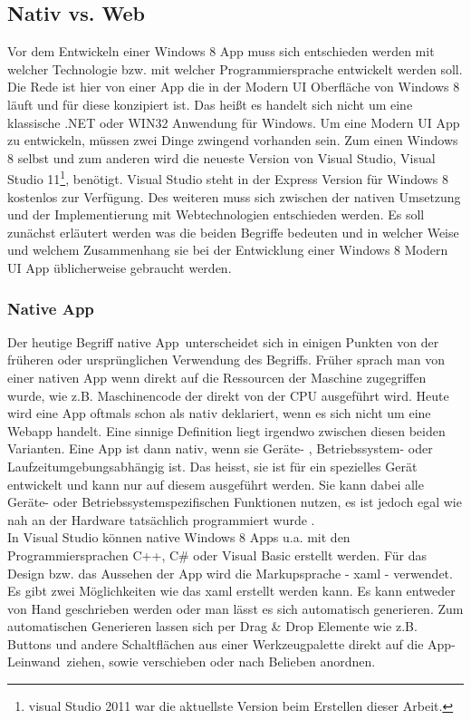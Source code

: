 \documentclass[12pt,a4paper]{scrartcl}
\begin{document}
\subsection{Nativ vs. Web}
\label{nativ_vs_web}
Vor dem Entwickeln einer Windows 8 App muss sich entschieden werden mit welcher Technologie bzw. mit welcher Programmiersprache entwickelt werden soll. Die Rede ist hier von einer App die in der Modern UI Oberfläche von Windows 8 läuft und für diese konzipiert ist. Das heißt es handelt sich nicht um eine klassische .NET oder WIN32 Anwendung für Windows. Um eine Modern UI App zu entwickeln, müssen zwei Dinge zwingend vorhanden sein. Zum einen Windows 8 selbst und zum anderen wird die neueste Version von Visual Studio, Visual Studio 11\footnote{visual Studio 2011 war die aktuellste Version beim Erstellen dieser Arbeit.}, benötigt. Visual Studio steht in der Express Version für Windows 8 kostenlos zur Verfügung. Des weiteren muss sich zwischen der nativen Umsetzung und der Implementierung mit Webtechnologien entschieden werden. Es soll zunächst erläutert werden was die beiden Begriffe bedeuten und in welcher Weise und welchem Zusammenhang sie bei der Entwicklung einer Windows 8 Modern UI App üblicherweise gebraucht werden.

\subsubsection{Native App}
\label{subsubsec:nativ}
Der heutige Begriff \glqq native App\grqq\ unterscheidet sich in einigen Punkten von der früheren oder ursprünglichen Verwendung des Begriffs. Früher sprach man von einer nativen App wenn direkt auf die Ressourcen der  Maschine zugegriffen wurde, wie z.B. Maschinencode der direkt von der CPU ausgeführt wird. Heute wird eine App oftmals schon als nativ deklariert, wenn es sich nicht um eine Webapp handelt. Eine sinnige Definition liegt irgendwo zwischen diesen beiden Varianten. Eine App ist dann nativ, wenn sie Geräte- , Betriebssystem- oder Laufzeitumgebungsabhängig ist. Das heisst, sie ist für ein spezielles Gerät entwickelt und kann nur auf diesem ausgeführt werden. Sie kann dabei alle Geräte- oder Betriebssystemspezifischen Funktionen nutzen, es ist jedoch egal wie nah an der Hardware tatsächlich programmiert wurde \citep{OBrian2013}.\\
In Visual Studio können native Windows 8  Apps u.a. mit den Programmiersprachen C++, C\# oder Visual Basic erstellt werden. Für das Design bzw. das Aussehen der App wird die Markupsprache - \ac{xaml} - verwendet. Es gibt zwei Möglichkeiten wie das \ac{xaml} erstellt werden kann. Es kann entweder von Hand geschrieben werden oder man lässt es sich automatisch generieren. Zum automatischen Generieren lassen sich per Drag \& Drop Elemente wie z.B. Buttons und andere Schaltflächen aus einer Werkzeugpalette direkt auf die \glqq App-Leinwand\grqq\ ziehen, sowie verschieben oder nach Belieben anordnen.
\end{document}
